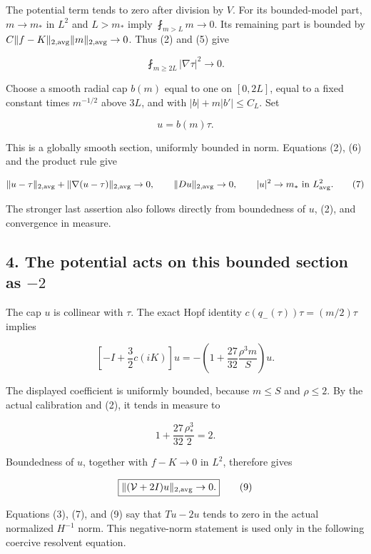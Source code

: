 The potential term tends to zero after division by \(V\). For its
bounded-model part, \(m\to m_*\) in \(L^2\) and \(L>m_*\) imply
\(\fint_{m>L}m\to0\). Its remaining part is bounded by
\(C\|f-K\|_{2,\rm avg}\|m\|_{2,\rm avg}\to0\). Thus (2) and (5) give

\[
 \fint_{m\ge2L}|\nabla\tau|^2\longrightarrow0.
\tag{6}
\]

Choose a smooth radial cap \(b(m)\) equal to one on \([0,2L]\), equal to
a fixed constant times \(m^{-1/2}\) above \(3L\), and with
\(|b|+m|b'|\le C_L\). Set

\[
 u=b(m)\tau.
\]

This is a globally smooth section, uniformly bounded in norm. Equations
(2), (6) and the product rule give

\[
 \|u-\tau\|_{2,\rm avg}+\|\nabla(u-\tau)\|_{2,\rm avg}\to0,
 \qquad \|Du\|_{2,\rm avg}\to0,
 \qquad |u|^2\to m_*\text{ in }L^2_{\rm avg}.
\tag{7}
\]

The stronger last assertion also follows directly from boundedness of
\(u\), (2), and convergence in measure.

\hypertarget{o10critical:the-potential-acts-on-this-bounded-section-as--2}{%
\subsection{\texorpdfstring{4. The potential acts on this bounded
section as
\(-2\)}{4. The potential acts on this bounded section as -2}}\label{o10critical:the-potential-acts-on-this-bounded-section-as--2}}

The cap \(u\) is collinear with \(\tau\). The exact Hopf identity
\(c(q_-(\tau))\tau=(m/2)\tau\) implies

\[
 \left[-I+\frac32c(iK)\right]u
 =-\left(1+\frac{27}{32}\frac{\rho^3m}{S}\right)u.
\tag{8}
\]

The displayed coefficient is uniformly bounded, because \(m\le S\) and
\(\rho\le2\). By the actual calibration and (2), it tends in measure to

\[
 1+\frac{27}{32}\frac{\rho_*^3}{2}=2.
\]

Boundedness of \(u\), together with \(f-K\to0\) in \(L^2\), therefore
gives

\[
 \boxed{\|(\mathcal V+2I)u\|_{2,\rm avg}\to0.}\tag{9}
\]

Equations (3), (7), and (9) say that \(Tu-2u\) tends to zero in the
actual normalized \(H^{-1}\) norm. This negative-norm statement is used
only in the following coercive resolvent equation.

